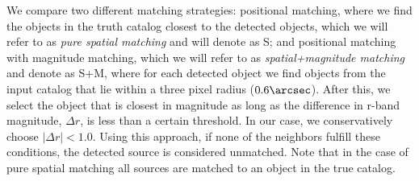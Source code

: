 \documentclass[\docopts]{\docclass}
\begin{document}
We compare two different matching strategies: positional matching, where we find the objects in the truth catalog closest to the detected objects, which we will refer to as \textit{pure spatial matching} and will denote as \textsf{S}; and positional matching with magnitude matching, which we will refer to as \textit{spatial+magnitude matching} and denote as \textsf{S+M}, where for each detected object we find objects from the input catalog that lie within a three pixel radius ($0.6 \arcsec$). After this, we select the object that is closest in magnitude as long as the difference in r-band magnitude, $\Delta r$, is less than a certain threshold. In our case, we conservatively choose $|\Delta r| < 1.0$. Using this approach, if none of the neighbors fulfill these conditions, the detected source is considered unmatched. Note that in the case of pure spatial matching all sources are matched to an object in the true catalog.
\end{document}
